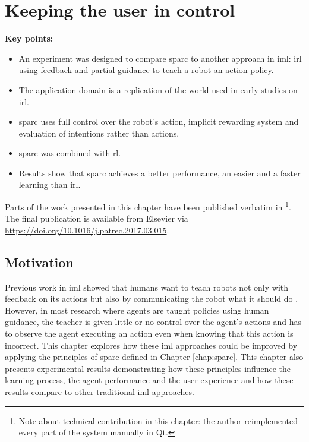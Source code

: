 \chapter{Keeping the user in control}\label{chap:control}
\glsresetall
\graphicspath{{images/control/}}

\newcommand{\nosemic}{\SetEndCharOfAlgoLine{\relax}}%
\newcommand{\dosemic}{\SetEndCharOfAlgoLine{\string;}}%
\newcommand{\pushline}{\Indp}%
\newcommand{\popline}{\Indm\dosemic}%

\begin{framed}
	\textbf{Key points:}
	
	\begin{itemize}
		\item An experiment was designed to compare \gls{sparc} to another approach in \gls{iml}: \gls{irl} using feedback and partial guidance to teach a robot an action policy.
		\item The application domain is a replication of the world used in early studies on \gls{irl}.
		\item \gls{sparc} uses full control over the robot's action, implicit rewarding system and evaluation of intentions rather than actions.
		\item \gls{sparc} was combined with \acrlong{rl}.
		\item Results show that \gls{sparc} achieves a better performance, an easier and a faster learning than \gls{irl}.
	\end{itemize}
\end{framed}

Parts of the work presented in this chapter have been published verbatim in \cite{senft2017supervised} \footnote{Note about technical contribution in this chapter: the author reimplemented every part of the system manually in Qt.}. The final publication is available from Elsevier via \url{https://doi.org/10.1016/j.patrec.2017.03.015}.

\newpage
\section{Motivation}

Previous work in \gls{iml} showed that humans want to teach robots not only with feedback on its actions but also by communicating the robot what it should do \citep{thomaz2008teachable}. However, in most research where agents are taught policies using human guidance, the teacher is given little or no control over the agent's actions and has to observe the agent executing an action even when knowing that this action is incorrect. This chapter explores how these \gls{iml} approaches could be improved by applying the principles of \gls{sparc} defined in Chapter \ref{chap:sparc}. This chapter also presents experimental results demonstrating how these principles influence the learning process, the agent performance and the user experience and how these results compare to other traditional \gls{iml} approaches.

